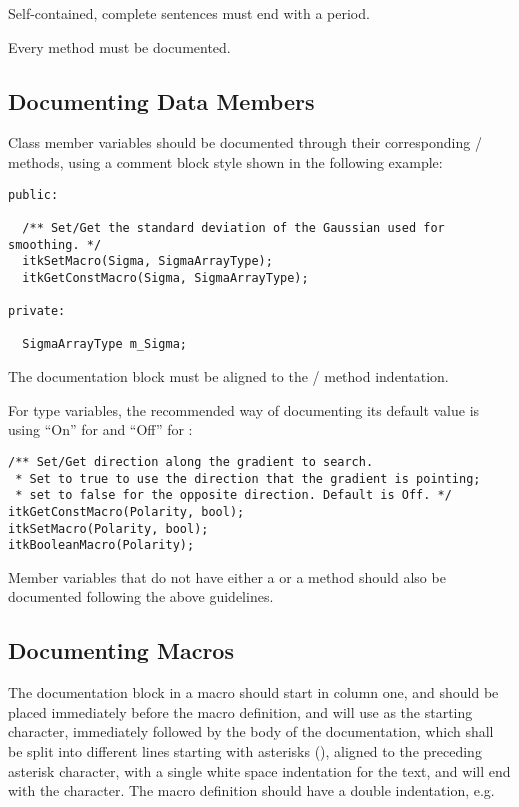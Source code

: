Self-contained, complete sentences must end with a period.

Every method must be documented.


\subsection{Documenting Data Members}
\label{subsec:DocumentingDataMembers}

Class member variables should be documented through their corresponding
/ methods, using a comment block style shown in
the following example:

\small
\begin{verbatim}
public:

  /** Set/Get the standard deviation of the Gaussian used for smoothing. */
  itkSetMacro(Sigma, SigmaArrayType);
  itkGetConstMacro(Sigma, SigmaArrayType);

private:

  SigmaArrayType m_Sigma;

\end{verbatim}
\normalsize

The documentation block must be aligned to the /
method indentation.

For  type variables, the recommended way of documenting its default
value is using ``On'' for  and ``Off'' for :

\small
\begin{verbatim}
/** Set/Get direction along the gradient to search.
 * Set to true to use the direction that the gradient is pointing;
 * set to false for the opposite direction. Default is Off. */
itkGetConstMacro(Polarity, bool);
itkSetMacro(Polarity, bool);
itkBooleanMacro(Polarity);
\end{verbatim}
\normalsize

Member variables that do not have either a  or a
 method should also be documented following the above
guidelines.


\subsection{Documenting Macros}
\label{subsec:DocumentingMacros}

The documentation block in a macro should start in column one, and should be
placed immediately before the macro definition, and will use \code{/*} as the
starting character, immediately followed by the body of the documentation, which
shall be split into different lines starting with asterisks (\code{*}), aligned
to the preceding asterisk character, with a single white space indentation for
the text, and will end with the \code{*/} character. The macro definition
should have a double indentation, e.g.

